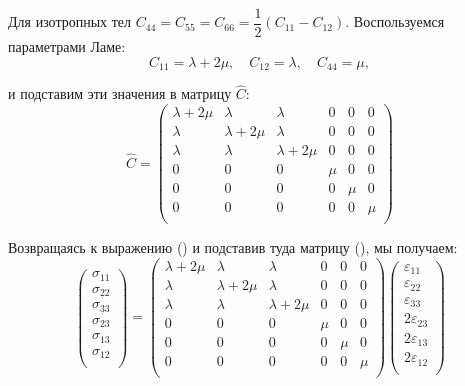 \documentclass[12pt,a4paper]{article}
\begin{document}
  Для изотропных тел $C_{44} = C_{55} = C_{66} = \dfrac{1}{2}(C_{11} - C_{12})$. Воспользуемся параметрами Ламе:
  \[ 
    C_{11} = \lambda + 2\mu, \quad C_{12} = \lambda, \quad C_{44} = \mu,
  \]

  и подставим эти значения в матрицу $\hat{C}\colon$
  \begin{equation}
    \hat{C} = 
    \begin{pmatrix}
      \lambda + 2\mu & \lambda & \lambda & 0 & 0 & 0 \\
      \lambda & \lambda + 2\mu & \lambda & 0 & 0 & 0 \\
      \lambda & \lambda & \lambda + 2\mu & 0 & 0 & 0 \\
           0 &      0 &      0 & \mu & 0 & 0 \\
           0 &      0 &      0 & 0 & \mu & 0 \\
           0 &      0 &      0 & 0 & 0 & \mu \\
    \end{pmatrix} 
    \label{Flex}
  \end{equation}

  Возвращаясь к выражению () и подставив туда матрицу (), мы получаем:
  \[
    \begin{pmatrix}
      \sigma_{11} \\
      \sigma_{22} \\
      \sigma_{33} \\
      \sigma_{23} \\
      \sigma_{13} \\
      \sigma_{12} \\
    \end{pmatrix}
    = 
    \begin{pmatrix}
      \lambda + 2\mu & \lambda & \lambda & 0 & 0 & 0 \\
      \lambda & \lambda + 2\mu & \lambda & 0 & 0 & 0 \\
      \lambda & \lambda & \lambda + 2\mu & 0 & 0 & 0 \\
           0 &      0 &      0 & \mu & 0 & 0 \\
           0 &      0 &      0 & 0 & \mu & 0 \\
           0 &      0 &      0 & 0 & 0 & \mu \\
    \end{pmatrix} 
    \begin{pmatrix}
      \varepsilon_{11} \\
      \varepsilon_{22} \\
      \varepsilon_{33} \\
      2\varepsilon_{23} \\
      2\varepsilon_{13} \\
      2\varepsilon_{12} \\
    \end{pmatrix}
  \]
  \pagebreak
\end{document}
